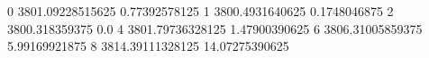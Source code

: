 0 3801.09228515625 0.77392578125
1 3800.4931640625 0.1748046875
2 3800.318359375 0.0
4 3801.79736328125 1.47900390625
6 3806.31005859375 5.99169921875
8 3814.39111328125 14.07275390625
